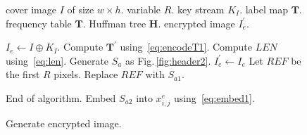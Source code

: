 \documentclass[journal]{IEEEtran}
\begin{document}
	\begin{figure}[!t]
		\begin{algorithm}[H]
			\caption{Generate encrypted image.}
			\label{algo:embed1}
			
			\begin{algorithmic}[1]
				\Require cover image \(I\) of size \(w \times h\).
				\Require variable \(R\).
				\Require key stream \(K_I\).
				\Require label map \(\mathbf{T}\).
				\Require frequency table \(\mathbf{T}\).
				\Require Huffman tree \(\mathbf{H}\).
				\Ensure encrypted image \(I_e^\prime\).

				\State \(I_e \gets I \oplus K_I\).
				\State Compute \(\mathbf{T^\prime}\) using~\eqref{eq:encodeT1}.
				\State Compute \(LEN\) using~\eqref{eq:len}.
				\State Generate \(S_a\) as Fig.\,\ref{fig:header2}.
				\State \(I_e^\prime \gets I_e\)
				\State Let \(REF\) be the first \(R\) pixels.
				\State Replace \(REF\) with \(S_{a1}\).
				
				\State			End of algorithm.
				\Else
				\State			Embed \(S_{a2}\) into \(x^e_{i, j}\) using~\eqref{eq:embed1}.
				\EndIf
				\EndFor
			\end{algorithmic}
		\end{algorithm}
	\end{figure}
	
\end{document}
